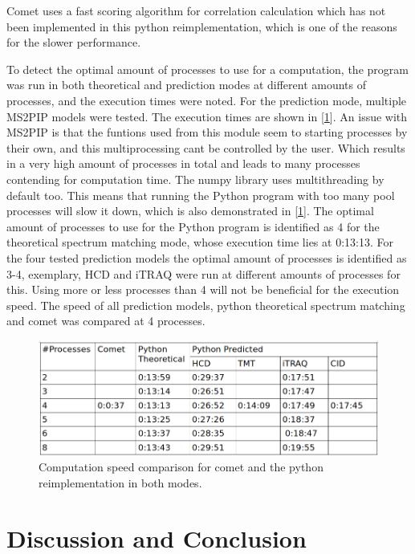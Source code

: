 \documentclass[11pt]{article}
\begin{document}
Comet uses a fast scoring algorithm for correlation calculation which has not been implemented in this python reimplementation, which is one of the reasons for the slower performance.

To detect the optimal amount of processes to use for a computation, the program was run in both theoretical and prediction modes at different amounts of processes, and the execution times were noted. For the prediction mode, multiple MS2PIP models were tested. The execution times are shown in [\cref{fig:speed-comparison}]. An issue with MS2PIP is that the funtions used from this module seem to starting processes by their own, and this multiprocessing cant be controlled by the user. Which results in a very high amount of processes in total and leads to many processes contending for computation time. The numpy library uses multithreading by default too. This means that running the Python program with too many pool processes will slow it down, which is also demonstrated in [\cref{fig:speed-comparison}]. The optimal amount of processes to use for the Python program is identified as 4 for the theoretical spectrum matching mode, whose execution time lies at 0:13:13. For the four tested prediction models the optimal amount of processes is identified as 3-4, exemplary, HCD and iTRAQ were run at different amounts of processes for this. Using more or less processes than 4 will not be beneficial for the execution speed. The speed of all prediction models, python theoretical spectrum matching and comet was compared at 4 processes.

\begin{figure}
\centering
\includegraphics[width=1\textwidth]{figs/speed-comparison.png}
\caption{Computation speed comparison for comet and the python reimplementation in both modes.}
\label{fig:speed-comparison}
\end{figure}

\newpage

\section{Discussion and Conclusion}
\end{document}
